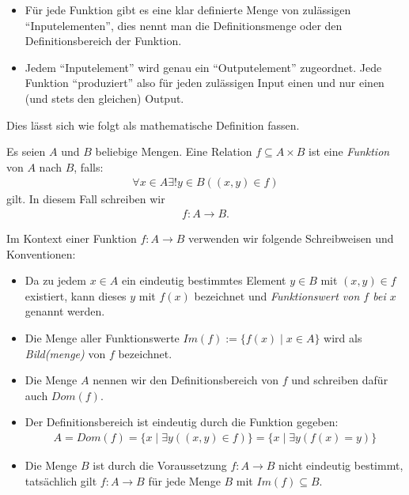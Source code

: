 \begin{itemize}
    \item Für jede Funktion gibt es eine klar definierte Menge von zulässigen ``Inputelementen'', dies nennt man die Definitionsmenge oder den Definitionsbereich der Funktion.
    \item Jedem ``Inputelement'' wird genau ein ``Outputelement'' zugeordnet. Jede Funktion ``produziert'' also für jeden zulässigen Input einen und nur einen (und stets den gleichen) Output.
\end{itemize}
Dies lässt sich wie folgt als mathematische Definition fassen.
\begin{df}
    Es seien $A$ und $B$ beliebige Mengen. Eine Relation $f\subseteq A\times B$ ist eine \textit{Funktion} von $A$ nach $B$, falls:
    \begin{align*}
    \forall x\in A\exists!y\in B((x,y)\in f)
    \end{align*}
    gilt. In diesem Fall schreiben wir
    \begin{align*}
    f:A\to B.
    \end{align*}
\end{df}

\begin{rk}
    Im Kontext einer Funktion $f:A\to B$ verwenden wir folgende Schreibweisen und Konventionen:
    \begin{itemize}
        \item Da zu jedem $x\in A$ ein eindeutig bestimmtes Element $y\in B$ mit $(x,y)\in f$ existiert, kann dieses $y$ mit $f(x)$ bezeichnet und \textit{Funktionswert von $f$ bei $x$} genannt werden.
        \item Die Menge aller Funktionswerte $Im(f) := \{f(x)\mid x\in A \}$ wird als \textit{Bild(menge)} von $f$ bezeichnet.
        \item Die Menge $A$ nennen wir den Definitionsbereich von $f$ und schreiben dafür auch $Dom(f)$.
        \item Der Definitionsbereich ist eindeutig durch die Funktion gegeben:
        \begin{align*}
            A=Dom(f)=\{x\mid \exists y ((x,y)\in f) \}=\{x\mid \exists y (f(x)=y )\}
        \end{align*}
        \item Die Menge $B$ ist durch die Voraussetzung $f:A\to B$ nicht eindeutig bestimmt, tatsächlich gilt $f:A\to B$ für jede Menge $B$ mit $Im(f)\subseteq B$.
    \end{itemize}
\end{rk}

